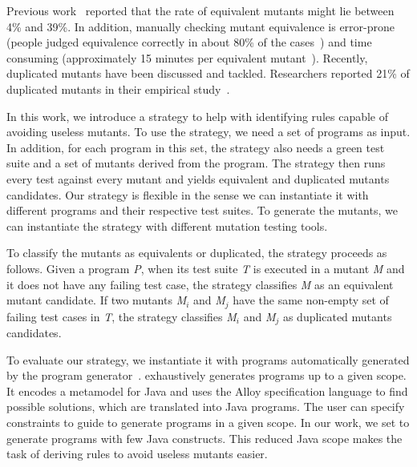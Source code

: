 Previous work~\cite{MADEYISKI:2014:1} reported that the rate of equivalent mutants might lie between 4\% and 39\%. 
In addition, manually checking mutant equivalence is error-prone (people judged equivalence correctly in about 80\% of the cases~\cite{ACREE:1980:1}) and time consuming (approximately 15 minutes per equivalent mutant~\cite{SHULER:2013:1}). 
Recently, duplicated mutants have been discussed and tackled. 
Researchers reported 21\% of duplicated mutants in their empirical study~\cite{KINTIS:2017:1}.

In this work, we introduce a strategy to help with identifying rules capable of avoiding useless mutants. 
To use the strategy, we need a set of programs as input. 
In addition, for each program in this set, the strategy also needs a green test suite and a set of mutants derived from the program. 
The strategy then runs every test against every mutant and yields equivalent and duplicated mutants candidates. 
Our strategy is flexible in the sense we can instantiate it with different programs and their respective test suites. To generate the mutants, we can instantiate the strategy with different mutation testing tools.



To classify the mutants as equivalents or duplicated, the strategy proceeds as follows. 
Given a program \textit{P}, when its test suite \textit{T} is executed in a mutant \textit{M} and it does not have any failing test case, the strategy classifies \textit{M} as an equivalent mutant candidate. If two mutants \textit{M$_i$} and \textit{M$_j$} have the same non-empty set of failing test cases in \textit{T}, the strategy classifies \textit{M$_i$} and \textit{M$_j$} as duplicated mutants candidates. 

To evaluate our strategy, we instantiate it with programs automatically generated by the \jdolly{} program generator~\cite{SOARES:2013:1}. 
\jdolly{} exhaustively generates programs up to a given scope. 
It encodes a metamodel for Java and uses the Alloy specification language \cite{alloy-book} to find possible solutions, which are translated into Java programs.
The user can specify constraints to guide \jdolly{} to generate programs in a given scope.
In our work, we set \jdolly{} to generate \AnalyzedPrograms programs with few Java constructs. 
This reduced Java scope makes the task of deriving rules to avoid useless mutants easier. 

